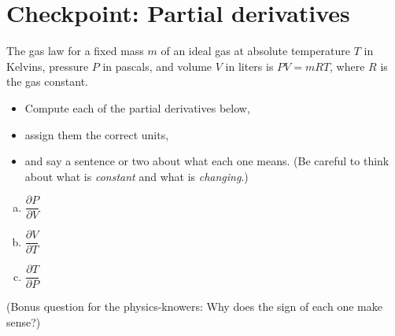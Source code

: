 


%


\allowdisplaybreaks
\section{Checkpoint: Partial derivatives}
The gas law for a fixed mass $m$ of an ideal gas at absolute temperature $T$ in Kelvins, pressure $P$ in pascals, and volume $V$ in liters is $PV = mRT$, where $R$ is the gas constant.

\begin{itemize}
    \item Compute each of the partial derivatives below,
    \item assign them the correct units,
    \item and say a sentence or two about what each one means. (Be careful to think about what is \textit{constant} and what is \textit{changing}.)
\end{itemize}

\begin{enumerate}[(a)]
    \item $\dfrac{\partial P}{\partial V}$
    \item $\dfrac{\partial V}{\partial T}$
    \item $\dfrac{\partial T}{\partial P}$
\end{enumerate}

(Bonus question for the physics-knowers: Why does the sign of each one make sense?)
	
